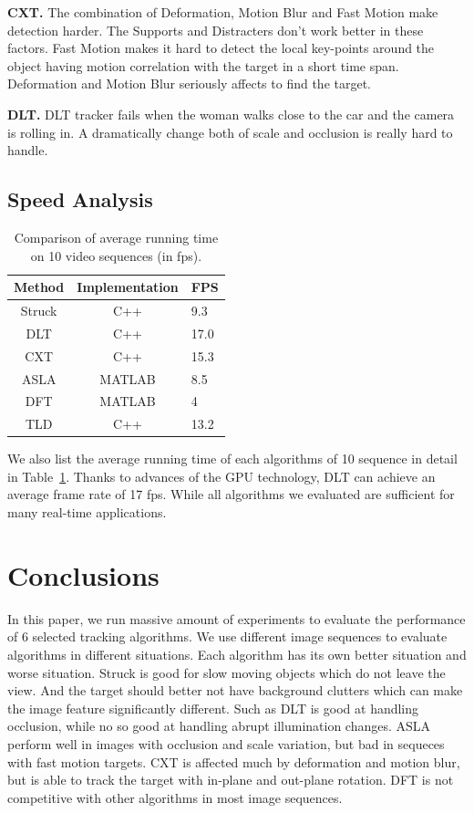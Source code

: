 \documentclass{acm_proc_article-sp}
\begin{document}
\textbf{CXT.} The combination of Deformation, Motion Blur and Fast Motion make detection harder. The Supports and Distracters don't work better in these factors. Fast Motion makes it hard to detect the local key-points around the object having motion correlation with the target in a short time span. Deformation and Motion Blur seriously affects to find the target.

\textbf{DLT.} DLT tracker fails when the woman walks close to the car and the camera is rolling in. A dramatically change both of scale and occlusion is really hard to handle.

\subsection{Speed Analysis}

\begin{table}
	\centering
	\begin{tabular}{|c|c|l|} \hline
		Method & Implementation & FPS\\ \hline
		Struck & C++ & 9.3\\ \hline
		DLT & C++ & 17.0\\ \hline
		CXT & C++ & 15.3\\ \hline
		ASLA & MATLAB & 8.5\\ \hline
		DFT & MATLAB & 4\\ \hline
		TLD & C++ & 13.2\\ \hline
	\end{tabular}
	\caption{Comparison of average running time on 10 video sequences (in fps).}
	\label{table:time}
\end{table}

We also list the average running time of each algorithms of 10 sequence in detail in Table~\ref{table:time}. Thanks to advances of the GPU technology, DLT can achieve an average frame rate of 17 fps. While all algorithms we evaluated are sufficient for many real-time applications.

\section{Conclusions}
In this paper, we run massive amount of experiments to evaluate the performance of 6 selected tracking algorithms.
We use different image sequences to evaluate algorithms in different situations.
Each algorithm has its own better situation and worse situation.
Struck is good for slow moving objects which do not leave the view. And the target should better not have background clutters which can make the image feature significantly different.
Such as DLT is good at handling occlusion, while no so good at handling abrupt illumination changes.
ASLA perform well in images with occlusion and scale variation, but bad in sequeces with fast motion targets.
CXT is affected much by deformation and motion blur, but is able to track the target with in-plane and out-plane rotation.
DFT is not competitive with other algorithms in most image sequences.
\end{document}
